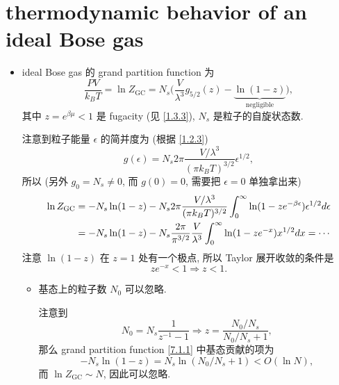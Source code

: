 \section{thermodynamic behavior of an ideal Bose gas}
\begin{itemize}
	\item ideal Bose gas 的 grand partition function 为
	\begin{equation} \label{7.1.1}
		\frac{P V}{k_B T} = \ln Z_\text{GC} = N_s \Big( \frac{V}{\lambda^3} g_{5 / 2}(z) - \underbrace{\ln(1 - z)}_{\text{negligible}} \Big),
	\end{equation}
	其中 $z = e^{\beta \mu} < 1$ 是 fugacity (见 \eqref{1.3.3}), $N_s$ 是粒子的自旋状态数.
	
	\begin{tcolorbox}[title=calculation:]
		注意到粒子能量 $\epsilon$ 的简并度为 (根据 \eqref{1.2.3})
		\begin{equation}
			g(\epsilon) = N_s 2 \pi \frac{V / \lambda^3}{(\pi k_B T)^{3 / 2}} \epsilon^{1 / 2},
		\end{equation}
		所以 (另外 $g_0 = N_s \neq 0$, 而 $g(0) = 0$, 需要把 $\epsilon = 0$ 单独拿出来)
		\begin{align}
			\ln Z_\text{GC} &= - N_s \ln(1 - z) - N_s 2 \pi \frac{V / \lambda^3}{(\pi k_B T)^{3 / 2}} \int_0^\infty \ln(1 - z e^{- \beta \epsilon}) \epsilon^{1 / 2} d\epsilon \notag \\
			&= - N_s \ln(1 - z) - N_s \frac{2 \pi}{\pi^{3 / 2}} \frac{V}{\lambda^3} \int_0^\infty \ln(1 - z e^{- x}) x^{1 / 2} dx = \cdots
		\end{align}
		注意 $\ln(1 - z)$ 在 $z = 1$ 处有一个极点, 所以 Taylor 展开收敛的条件是
		\begin{equation} \label{7.1.4}
			z e^{- x} < 1 \Longrightarrow z < 1.
		\end{equation}
	\end{tcolorbox}
	
	\begin{itemize}
		\item 基态上的粒子数 $N_0$ 可以忽略.
		
		\begin{tcolorbox}[title=proof:]
			注意到
			\begin{equation}
				N_0 = N_s \frac{1}{z^{- 1} - 1} \Longrightarrow z = \frac{N_0 / N_s}{N_0 / N_s + 1},
			\end{equation}
			那么 grand partition function \eqref{7.1.1} 中基态贡献的项为
			\begin{equation}
				- N_s \ln(1 - z) = N_s \ln(N_0 / N_s + 1) < O(\ln N),
			\end{equation}
			而 $\ln Z_\text{GC} \sim N$, 因此可以忽略.
		\end{tcolorbox}
	\end{itemize}
	

\end{itemize}

